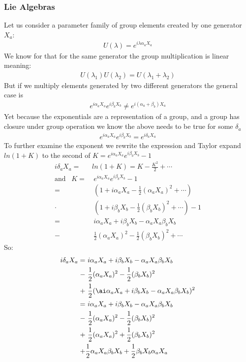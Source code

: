 \documentclass[a4paper]{article}
\theoremstyle{definition}
\theoremstyle{definition}
\theoremstyle{definition}
\theoremstyle{theorem}
\theoremstyle{theorem}
\theoremstyle{theorem}
\theoremstyle{definition}
\begin{document}
\subsubsection{Lie Algebras}
    Let us consider a parameter family of group elements created by one generator $X_a$:
    \begin{align}
        U(\lambda) = e^{i\lambda \alpha _a X_a}
    \end{align}
    We know for that for the same generator the group multiplication is linear meaning:
    \begin{align}
        U(\lambda _1)U(\lambda _2) = U(\lambda_1 + \lambda_2)
    \end{align}
    But if we multiply elements generated by two different generators the general case is
    \begin{align}
        e^{i\alpha_a X_a} e^{i\beta_b X_b} \neq  e^{i (\alpha _a + \beta_b) X_a}
    \end{align}
    Yet because the exponentials are a representation of a group, and a group has closure under
    group operation we know the above needs to be true for some $\delta _a$
    \begin{align}
        e^{i\alpha_a X_a} e^{i\beta_b X_b} = e^{i \delta _a X_a}
    \end{align}
    To further examine the exponent we rewrite the expression and Taylor expand $ln(1+K)$
    to the second of $K = e^{i\alpha_a X_a} e^{i\beta_b X_b} -1$
    \begin{align*}
        i\delta _a X_a =& ln(1 + K) = K - \frac{K^2}{2} + \cdots \\
        \text{and}\;\;\; K =&\ e^{i\alpha_a X_a} e^{i\beta_b X_b} -1 \\
          =&\ (1 + i\alpha _a X_a - \frac{1}{2}(\alpha _a X_a)^2 + \cdots) \\
          \cdot&\ (1 + i\beta _b X_b - \frac{1}{2}(\beta _b X_b)^2 + \cdots) -1 \\
          =&\ i\alpha _a X_a + i\beta _b X_b - \alpha_a X_a \beta _b X_b \\
          -&\ \frac{1}{2}(\alpha _a X_a)^2 - \frac{1}{2}(\beta _b X_b)^2 + \cdots
    \end{align*}
    So:
    \begin{align*}
        i\delta _a X_a =&\ i\alpha _a X_a + i\beta _b X_b - \alpha_a X_a \beta _b X_b \\
          -&\ \frac{1}{2}(\alpha _a X_a)^2 - \frac{1}{2}(\beta _b X_b)^2 \\
          +&\ \frac{1}{2}(\ai\alpha _a X_a + i\beta _b X_b - \alpha_a X_a \beta _b X_b)^2 \\
          =&\ i\alpha _a X_a + i\beta _b X_b - \alpha_a X_a \beta _b X_b \\
          -&\ \frac{1}{2}(\alpha _a X_a)^2 - \frac{1}{2}(\beta _b X_b)^2  \\
          +&\ \frac{1}{2}(\alpha _a X_a)^2 + \frac{1}{2}(\beta _b X_b)^2 \\
          +& \frac{1}{2}\alpha _a X_a \beta _b X_b + \frac{1}{2}\beta _b X_b \alpha _a X_a
    \end{align*}
\end{document}
